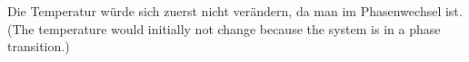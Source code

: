 Die Temperatur würde sich zuerst nicht verändern, da man im Phasenwechsel ist.  
(The temperature would initially not change because the system is in a phase transition.)